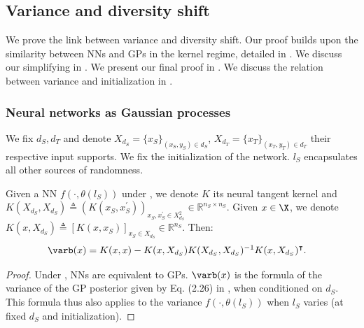 \subsection{Variance and diversity shift}
\label{app:var_diversity}
We prove the link between variance and diversity shift.
Our proof builds upon the similarity between NNs and GPs in the kernel regime, detailed in .
We discuss our simplifying  in .
We present our final proof in . We discuss the relation between variance and initialization in .

\subsubsection{Neural networks as Gaussian processes}
\label{app:nns_as_gps}
We fix $d_S, d_T$ and denote $X_{d_S}=\{x_S\}_{(x_S,y_S)\in d_S}$, $X_{d_T}=\{x_T\}_{(x_T,y_T)\in d_T}$ their respective input supports.
We fix the initialization of the network.
$l_S$ encapsulates all other sources of randomness.
\begin{lemma} \label{lemma:var_gp}
    Given a NN $f(\cdot, \theta(l_S))$ under , we denote $K$ its neural tangent kernel and $K(X_{d_S}, X_{d_S})\triangleq(K\left(x_S, x_S^\prime\right))_{x_S, x_S^\prime \in X_{d_S}^2} \in \mathbb{R}^{n_S\times n_S}$.
    Given $x\in\X$, we denote $K(x, X_{d_S})\triangleq[K\left(x, x_S\right)]_{x_S \in X_{d_S}} \in \mathbb{R}^{n_S}$. Then:
    \begin{equation}
        \begin{aligned}
            &\varb(x) = K(x, x)-K(x, X_{d_S})K(X_{d_S}, X_{d_S})^{-1} K(x, X_{d_S})^\intercal.
        \end{aligned}\label{eq:var}
    \end{equation}
\end{lemma}
\begin{proof}
    Under , NNs are equivalent to GPs.
    $\varb(x)$ is the formula of the variance of the GP posterior given by Eq. (2.26) in \cite{RasmussenW06}, when conditioned on $d_S$.
    This formula thus also applies to the variance $f(\cdot,\theta(l_S))$ when $l_S$ varies (at fixed $d_S$ and initialization).
\end{proof}


